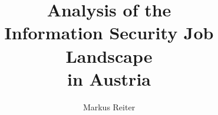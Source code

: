 \usepackage{lmodern}
\usepackage[english]{babel}

\usepackage{fontspec}

\usepackage{multicol}

\usepackage{listings}

\usepackage{graphicx}
\graphicspath{{assets/}}

\newcommand{\german}[1]{{#1}}

\title{Analysis of the \texorpdfstring{\\}{} Information Security Job Landscape \texorpdfstring{\\}{} in Austria}
\author{Markus Reiter}
